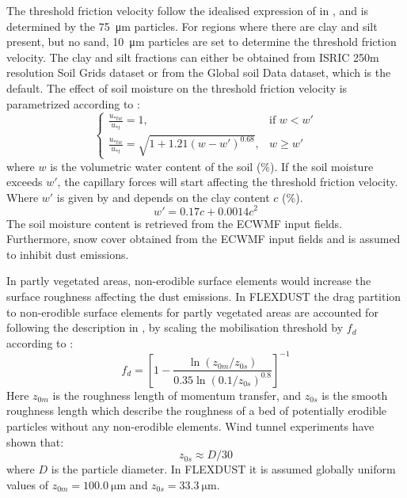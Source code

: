 The threshold friction velocity follow the idealised expression of \textcite{shao2000simple} in , and is determined by the \SI{75}{\micro\metre} particles. 
For regions where there are clay and silt present, but no sand, \SI{10}{\micro\metre} 
particles are set to determine the threshold friction velocity. The clay and 
silt fractions can either be obtained from ISRIC 250m resolution Soil Grids dataset 
\parencite{soil-grid_ref} or from the Global soil Data \cite{task2014global} dataset, which is the default. The effect of soil moisture on the threshold friction velocity is parametrized according to \textcite{fecan1998parametrization}:
\begin{equation}
    \begin{cases}
    \frac{u_{*tw}}{u_{*t}}=1, & \text{if } w < w' \\
    \frac{u_{*tw}}{u_{*t}}=\sqrt{1+1.21(w-w')^{0.68}}, & w \geq w'
    \end{cases}
\end{equation}
where $w$ is the volumetric water content of the soil (\%). If the soil moisture exceeds $w'$, the capillary 
forces will start affecting the threshold friction velocity. Where $w'$ is given by  
and depends on the clay content $c$ (\%).   
\begin{equation} \label{eq:moisture_clay}
    w' = 0.17c + 0.0014c^2
\end{equation}
The soil moisture content is retrieved from the ECWMF input fields. Furthermore, snow cover obtained from the ECWMF input fields and is
assumed to inhibit dust emissions. 
\par In partly vegetated areas, non-erodible surface elements would increase the surface 
roughness affecting the dust emissions. In FLEXDUST the drag partition to non-erodible 
surface elements for partly vegetated areas are accounted for following the description in 
\textcite{zender2003mineral}, by scaling the mobilisation threshold by $f_d$ according to :
\begin{equation}\label{eq:drag_partition}
    f_d = \left[1 - \frac{\ln (z_{0m}/z_{0s})}{0.35\ln (0.1/z_{0s})^{0.8}}\right]^{-1}
\end{equation}
Here $z_{0m}$ is the roughness length of momentum transfer, and $z_{0s}$ is the smooth roughness length which 
describe the roughness of a bed of potentially erodible particles without any non-erodible elements. Wind tunnel 
experiments have shown that: 
\begin{equation}
    z_{0s} \approx D/30
\end{equation}
where $D$ is the particle diameter. In FLEXDUST it is assumed globally uniform values of  $z_{0m}=\SI{100.0}{\micro\metre}$ and $z_{0s}=\SI{33.3}{\micro\metre}$.

